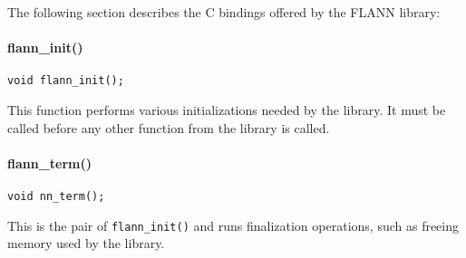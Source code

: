 \documentclass[letter,10pt]{article}
\begin{document}
The following section describes the C bindings offered by the FLANN
library:

\paragraph{flann\_init()}

\begin{Verbatim}[fontsize=\footnotesize,frame=single]
void flann_init();
\end{Verbatim}
This function performs various initializations needed by the library. It
must be called before any other function from the library is called.

\paragraph{flann\_term()}
\begin{Verbatim}[fontsize=\footnotesize,frame=single]
void nn_term();
\end{Verbatim}
This is the pair of \texttt{flann\_init()} and runs finalization
operations, such as freeing memory used by the library.
\end{document}
